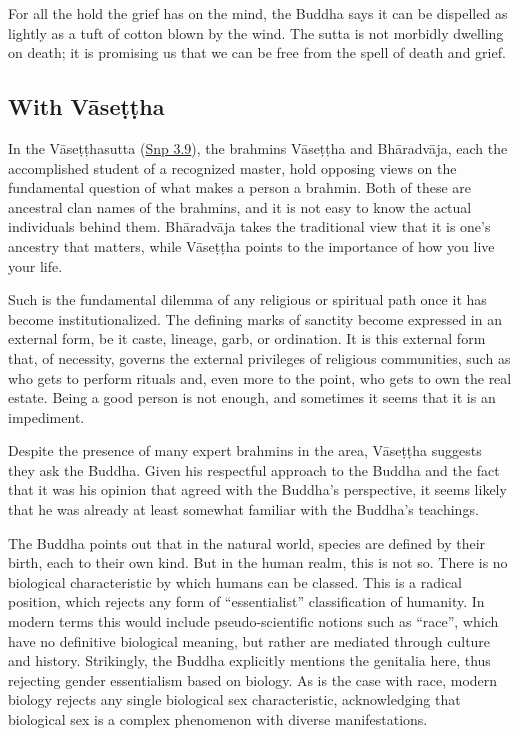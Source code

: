 \documentclass[12pt,openany]{book}%
\begin{document}
For all the hold the grief has on the mind, the Buddha says it can be dispelled as lightly as a tuft of cotton blown by the wind. The sutta is not morbidly dwelling on death; it is promising us that we can be free from the spell of death and grief.

\subsection*{With \textsanskrit{Vāseṭṭha}}

In the \textsanskrit{Vāseṭṭhasutta} (\href{https://suttacentral.net/snp3.9/en/sujato}{Snp 3.9}), the brahmins \textsanskrit{Vāseṭṭha} and \textsanskrit{Bhāradvāja}, each the accomplished student of a recognized master, hold opposing views on the fundamental question of what makes a person a brahmin. Both of these are ancestral clan names of the brahmins, and it is not easy to know the actual individuals behind them. \textsanskrit{Bhāradvāja} takes the traditional view that it is one’s ancestry that matters, while \textsanskrit{Vāseṭṭha} points to the importance of how you live your life.

Such is the fundamental dilemma of any religious or spiritual path once it has become institutionalized. The defining marks of sanctity become expressed in an external form, be it caste, lineage, garb, or ordination. It is this external form that, of necessity, governs the external privileges of religious communities, such as who gets to perform rituals and, even more to the point, who gets to own the real estate. Being a good person is not enough, and sometimes it seems that it is an impediment.

Despite the presence of many expert brahmins in the area, \textsanskrit{Vāseṭṭha} suggests they ask the Buddha. Given his respectful approach to the Buddha and the fact that it was his opinion that agreed with the Buddha’s perspective, it seems likely that he was already at least somewhat familiar with the Buddha’s teachings.

The Buddha points out that in the natural world, species are defined by their birth, each to their own kind. But in the human realm, this is not so. There is no biological characteristic by which humans can be classed. This is a radical position, which rejects any form of “essentialist” classification of humanity. In modern terms this would include pseudo-scientific notions such as “race”, which have no definitive biological meaning, but rather are mediated through culture and history. Strikingly, the Buddha explicitly mentions the genitalia here, thus rejecting gender essentialism based on biology. As is the case with race, modern biology rejects any single biological sex characteristic, acknowledging that biological sex is a complex phenomenon with diverse manifestations.
\end{document}
